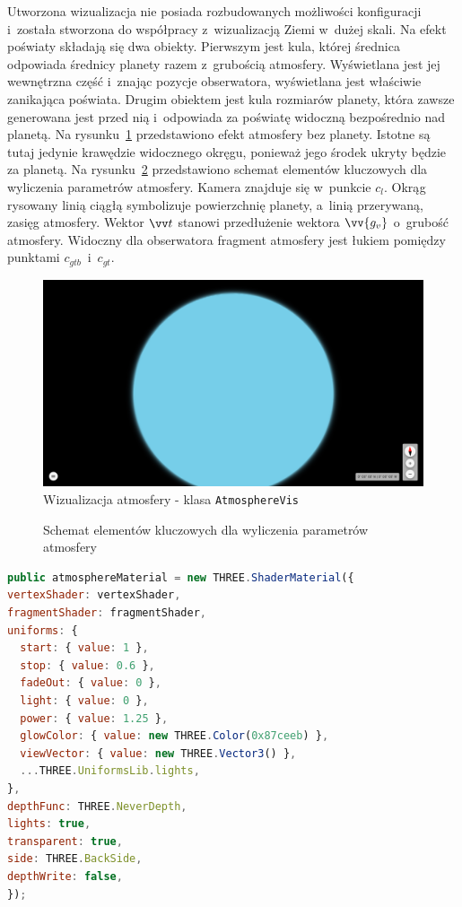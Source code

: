Utworzona wizualizacja nie posiada rozbudowanych możliwości konfiguracji i~została stworzona do współpracy z~wizualizacją Ziemi w~dużej skali. Na efekt poświaty składają się dwa obiekty. Pierwszym jest kula, której średnica odpowiada średnicy planety razem z~grubością atmosfery. Wyświetlana jest jej wewnętrzna część i~znając pozycje obserwatora, wyświetlana jest właściwie zanikająca poświata. Drugim obiektem jest kula rozmiarów planety, która zawsze generowana jest przed nią i~odpowiada za poświatę widoczną bezpośrednio nad planetą. Na rysunku~\ref{fig:c4_atmosphereVis} przedstawiono efekt atmosfery bez planety. Istotne są tutaj jedynie krawędzie widocznego okręgu, ponieważ jego środek ukryty będzie za planetą. Na rysunku~\ref{fig:atmosphere} przedstawiono schemat elementów kluczowych dla wyliczenia parametrów atmosfery. Kamera znajduje się w~punkcie $c_l$. Okrąg rysowany linią ciągłą symbolizuje powierzchnię planety, a~linią przerywaną, zasięg atmosfery. Wektor $\vv t$ stanowi przedłużenie wektora $\vv{g_v}$ o~grubość atmosfery. Widoczny dla obserwatora fragment atmosfery jest łukiem pomiędzy punktami $c_{gtb}$~i~$c_{gt}$.

\begin{figure}
\centering
\includegraphics[width=\linewidth]{img/c4_atmosphereVis.png}
\caption{Wizualizacja atmosfery - klasa \texttt{AtmosphereVis}}
\label{fig:c4_atmosphereVis} 
\end{figure}

\begin{figure}[h]
\centering

\caption{Schemat elementów kluczowych dla wyliczenia parametrów atmosfery}
\label{fig:atmosphere}
\end{figure}

\begin{lstlisting}[float, language=javascript, label={lst:atmosphereVis}, caption={
Fragmenty klasy \texttt{StarsVis}}
]
public atmosphereMaterial = new THREE.ShaderMaterial({
vertexShader: vertexShader,
fragmentShader: fragmentShader,
uniforms: {
  start: { value: 1 },
  stop: { value: 0.6 },
  fadeOut: { value: 0 },
  light: { value: 0 },
  power: { value: 1.25 },
  glowColor: { value: new THREE.Color(0x87ceeb) },
  viewVector: { value: new THREE.Vector3() },
  ...THREE.UniformsLib.lights,
},
depthFunc: THREE.NeverDepth,
lights: true,
transparent: true,
side: THREE.BackSide,
depthWrite: false,
});
\end{lstlisting}

